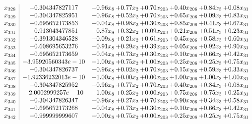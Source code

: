 \documentclass[8pt]{article}
\begin{document}
\[\begin{array}{c| c c@{\hskip 2pt} c@{\hskip 2pt} c@{\hskip 2pt} c@{\hskip 2pt} c@{\hskip 2pt} c@{\hskip 2pt} }
 x_{328}   &  -0.304347827117 & +  0.96 x_{8} & +  0.77 x_{2} & +  0.70 x_{203} & +  0.40 x_{206} & +  0.84 x_{3} & +  0.08 x_{31}\\
 x_{329}   &  -0.304347825951 & +  0.96 x_{8} & +  0.52 x_{2} & +  0.70 x_{203} & +  0.65 x_{206} & +  0.09 x_{3} & +  0.83 x_{31}\\
 x_{330}   &  -0.695652173853 & +  0.04 x_{8} & +  0.98 x_{2} & +  0.30 x_{203} & +  0.85 x_{206} & +  0.41 x_{3} & +  0.67 x_{31}\\
 x_{331}   &  -0.913043477851 & +  0.87 x_{8} & +  0.32 x_{2} & +  0.09 x_{203} & +  0.21 x_{206} & +  0.51 x_{3} & +  0.23 x_{31}\\
 x_{332}   &  -0.391304346528 & +  0.09 x_{8} & +  0.21 x_{2} & +  0.61 x_{203} & +  0.45 x_{206} & +  0.58 x_{3} & +  0.60 x_{31}\\
 x_{333}   &  -0.608695653276 & +  0.91 x_{8} & +  0.29 x_{2} & +  0.39 x_{203} & +  0.05 x_{206} & +  0.92 x_{3} & +  0.90 x_{31}\\
 x_{334}   &  -0.695652173659 & +  0.04 x_{8} & +  0.73 x_{2} & +  0.30 x_{203} & +  0.10 x_{206} & +  0.66 x_{3} & +  0.42 x_{31}\\
 x_{335}   &  -3.95920560343e-10 & +  1.00 x_{8} & +  0.75 x_{2} & +  1.00 x_{203} & +  0.25 x_{206} & +  0.25 x_{3} & +  0.75 x_{31}\\
 x_{336}   &  -0.304347826737 & +  0.96 x_{8} & +  0.02 x_{2} & +  0.70 x_{203} & +  0.15 x_{206} & +  0.59 x_{3} & +  0.33 x_{31}\\
 x_{337}   &  -1.92336232013e-10 & +  1.00 x_{8} & +  0.00 x_{2} & +  0.00 x_{203} & +  1.00 x_{206} & +  1.00 x_{3} & +  1.00 x_{31}\\
 x_{338}   &  -0.304347825952 & +  0.96 x_{8} & +  0.77 x_{2} & +  0.70 x_{203} & +  0.40 x_{206} & +  0.84 x_{3} & +  0.08 x_{31}\\
 x_{339}   &  -2.0002999257e-10 & +  1.00 x_{8} & +  0.25 x_{2} & +  0.00 x_{203} & +  0.75 x_{206} & +  0.75 x_{3} & +  0.25 x_{31}\\
 x_{340}   &  -0.304347826347 & +  0.96 x_{8} & +  0.27 x_{2} & +  0.70 x_{203} & +  0.90 x_{206} & +  0.34 x_{3} & +  0.58 x_{31}\\
 x_{341}   &  -0.695652173268 & +  0.04 x_{8} & +  0.73 x_{2} & +  0.30 x_{203} & +  0.10 x_{206} & +  0.66 x_{3} & +  0.42 x_{31}\\
 x_{342}   &  -0.999999999607 & +  0.00 x_{8} & +  0.75 x_{2} & +  0.00 x_{203} & +  0.25 x_{206} & +  0.25 x_{3} & +  0.75 x_{31}\\

\end{array}\]
\end{document}

